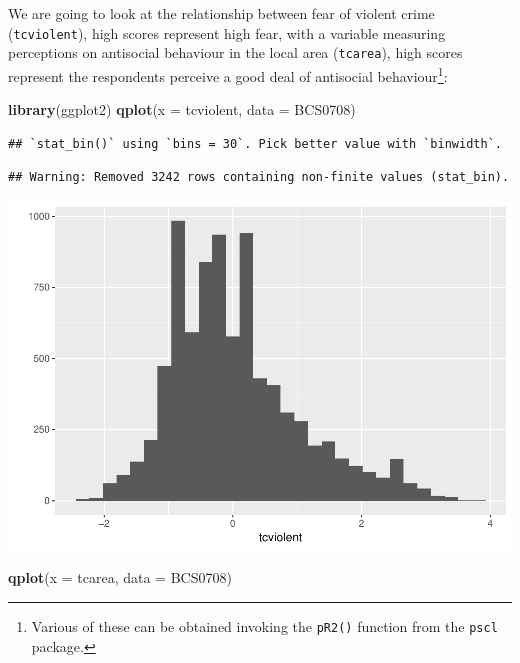 \documentclass[]{book}
\newenvironment{Shaded}{\begin{snugshade}}{\end{snugshade}}
\newcommand{\DataTypeTok}[1]{\textcolor[rgb]{0.13,0.29,0.53}{#1}}
\newcommand{\KeywordTok}[1]{\textcolor[rgb]{0.13,0.29,0.53}{\textbf{#1}}}
\newcommand{\NormalTok}[1]{#1}
\let\rmarkdownfootnote\footnote%
\def\footnote{\protect\rmarkdownfootnote}
\theoremstyle{definition}
\theoremstyle{definition}
\theoremstyle{definition}
\theoremstyle{remark}
\begin{document}
We are going to look at the relationship between fear of violent crime
(\texttt{tcviolent}), high scores represent high fear, with a variable
measuring perceptions on antisocial behaviour in the local area
(\texttt{tcarea}), high scores represent the respondents perceive a good
deal of antisocial behaviour\footnote{Various of these can be obtained
  invoking the \texttt{pR2()} function from the \texttt{pscl} package.}:

\begin{Shaded}
\begin{Highlighting}[]
\KeywordTok{library}\NormalTok{(ggplot2)}
\KeywordTok{qplot}\NormalTok{(}\DataTypeTok{x =}\NormalTok{ tcviolent, }\DataTypeTok{data =}\NormalTok{ BCS0708)}
\end{Highlighting}
\end{Shaded}

\begin{verbatim}
## `stat_bin()` using `bins = 30`. Pick better value with `binwidth`.
\end{verbatim}

\begin{verbatim}
## Warning: Removed 3242 rows containing non-finite values (stat_bin).
\end{verbatim}

\includegraphics{08-regression_files/figure-latex/unnamed-chunk-2-1.pdf}

\begin{Shaded}
\begin{Highlighting}[]
\KeywordTok{qplot}\NormalTok{(}\DataTypeTok{x =}\NormalTok{ tcarea, }\DataTypeTok{data =}\NormalTok{ BCS0708)}
\end{Highlighting}
\end{Shaded}
\end{document}
